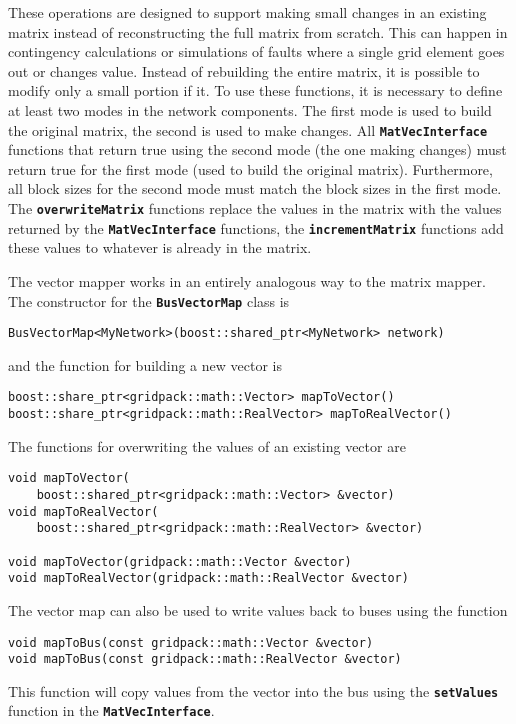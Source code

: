 These operations are designed to support making small changes in an existing matrix instead of reconstructing the full matrix from scratch. This can happen in contingency calculations or simulations of faults where a single grid element goes out or changes value. Instead of rebuilding the entire matrix, it is possible to modify only a small portion if it. To use these functions, it is necessary to define at least two modes in the network components. The first mode is used to build the original matrix, the second is used to make changes. All \texttt{\textbf{MatVecInterface}} functions that return true using the second mode (the one making changes) must return true for the first mode (used to build the original matrix). Furthermore, all block sizes for the second mode must match the block sizes in the first mode. The \texttt{\textbf{overwriteMatrix}} functions replace the values in the matrix with the values returned by the \texttt{\textbf{MatVecInterface}} functions, the \texttt{\textbf{incrementMatrix}} functions add these values to whatever is already in the matrix.

The vector mapper works in an entirely analogous way to the matrix mapper. The constructor for the \texttt{\textbf{BusVectorMap}} class is

{
\color{red}
\begin{Verbatim}[fontseries=b]
BusVectorMap<MyNetwork>(boost::shared_ptr<MyNetwork> network)
\end{Verbatim}
}

and the function for building a new vector is

{
\color{red}
\begin{Verbatim}[fontseries=b]
boost::share_ptr<gridpack::math::Vector> mapToVector()
boost::share_ptr<gridpack::math::RealVector> mapToRealVector()
\end{Verbatim}
}

The functions for overwriting the values of an existing vector are

{
\color{red}
\begin{Verbatim}[fontseries=b]
void mapToVector(
    boost::shared_ptr<gridpack::math::Vector> &vector)
void mapToRealVector(
    boost::shared_ptr<gridpack::math::RealVector> &vector)

void mapToVector(gridpack::math::Vector &vector)
void mapToRealVector(gridpack::math::RealVector &vector)
\end{Verbatim}
}

The vector map can also be used to write values back to buses using the function

{
\color{red}
\begin{Verbatim}[fontseries=b]
void mapToBus(const gridpack::math::Vector &vector)
void mapToBus(const gridpack::math::RealVector &vector)
\end{Verbatim}
}

This function will copy values from the vector into the bus using the \texttt{\textbf{setValues}} function in the \texttt{\textbf{MatVecInterface}}.
